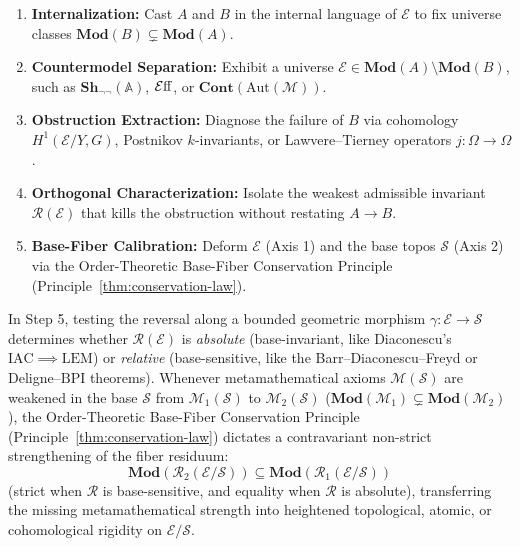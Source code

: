 \begin{enumerate}

  \item \textbf{Internalization:} Cast $A$ and $B$ in the internal language of $\mathcal{E}$ to fix universe classes $\mathbf{Mod}(B) \subsetneq \mathbf{Mod}(A)$.

  \item \textbf{Countermodel Separation:} Exhibit a universe $\mathcal{E} \in \mathbf{Mod}(A) \setminus \mathbf{Mod}(B)$, such as $\mathbf{Sh}_{\neg\neg}(\mathbb{A})$, $\mathcal{E}\mathrm{ff}$, or $\mathbf{Cont}(\mathrm{Aut}(\mathcal{M}))$.

  \item \textbf{Obstruction Extraction:} Diagnose the failure of $B$ via cohomology $H^1(\mathcal{E}/Y, G)$, Postnikov $k$-invariants, or Lawvere--Tierney operators $j: \Omega \to \Omega$.

  \item \textbf{Orthogonal Characterization:} Isolate the weakest admissible invariant $\mathcal{R}(\mathcal{E})$ that kills the obstruction without restating $A \to B$.

  \item \textbf{Base-Fiber Calibration:} Deform $\mathcal{E}$ (Axis 1) and the base topos $\mathcal{S}$ (Axis 2) via the Order-Theoretic Base-Fiber Conservation Principle (Principle~\ref{thm:conservation-law}).

\end{enumerate}

In Step 5, testing the reversal along a bounded geometric morphism $\gamma: \mathcal{E} \to \mathcal{S}$ determines whether $\mathcal{R}(\mathcal{E})$ is \emph{absolute} (base-invariant, like Diaconescu's $\mathrm{IAC} \implies \mathrm{LEM}$) or \emph{relative} (base-sensitive, like the Barr--Diaconescu--Freyd or Deligne--$\mathrm{BPI}$ theorems). Whenever metamathematical axioms $\mathcal{M}(\mathcal{S})$ are weakened in the base $\mathcal{S}$ from $\mathcal{M}_1(\mathcal{S})$ to $\mathcal{M}_2(\mathcal{S})$ ($\mathbf{Mod}(\mathcal{M}_1) \subsetneq \mathbf{Mod}(\mathcal{M}_2)$), the Order-Theoretic Base-Fiber Conservation Principle (Principle~\ref{thm:conservation-law}) dictates a contravariant non-strict strengthening of the fiber residuum:
\[
  \mathbf{Mod}(\mathcal{R}_2(\mathcal{E}/\mathcal{S})) \subseteq \mathbf{Mod}(\mathcal{R}_1(\mathcal{E}/\mathcal{S}))
\]
(strict when $\mathcal{R}$ is base-sensitive, and equality when $\mathcal{R}$ is absolute), transferring the missing metamathematical strength into heightened topological, atomic, or cohomological rigidity on $\mathcal{E}/\mathcal{S}$.

